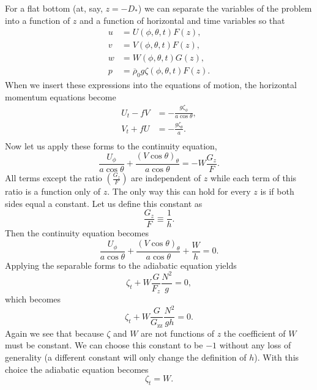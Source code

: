 \documentclass[11pt]{article}
\begin{document}
For a flat bottom (at, say, $z = -D_*$) we can separate the variables of the problem into a function of $z$ and a function of horizontal and time variables so that
\begin{align*}
u &= U(\phi,\theta,t) F(z), \\
v &= V(\phi,\theta,t) F(z), \\
w &= W(\phi,\theta,t) G(z), \\
p &= \overline{\rho}_0 g \zeta(\phi,\theta,t) F(z).
\end{align*}
When we insert these expressions into the equations of motion, the horizontal momentum equations become
\begin{align*}
U_t - f V &= -\frac{g \zeta_\phi}{a \cos\theta}, \\
V_t + f U &= -\frac{g \zeta_\theta}{a}. \\
\end{align*}
Now let us apply these forms to the continuity equation,
\begin{equation*}
\frac{U_\phi}{a\cos\theta}+\frac{\left(V\cos\theta\right)_\theta}{a\cos\theta}=-W\frac{G_z}{F}.
\end{equation*}
All terms except the ratio $\left(\frac{G_z}{F}\right)$ are independent of $z$ while each term of this ratio is a function only of $z$. The only way this can hold for every $z$ is if both sides equal a constant. Let us define this constant as
\begin{equation*}
\frac{G_z}{F} \equiv \frac{1}{h}.
\end{equation*}
Then the continuity equation becomes
\begin{equation*}
\frac{U_\phi}{a\cos\theta}+\frac{\left(V\cos\theta\right)_\theta}{a\cos\theta}+\frac{W}{h} = 0.
\end{equation*}
Applying the separable forms to the adiabatic equation yields
\begin{equation*}
\zeta_t+W\frac{G}{F_z}\frac{N^2}{g} = 0,
\end{equation*}
which becomes
\begin{equation*}
\zeta_t+W\frac{G}{G_\textrm{zz}}\frac{N^2}{g h} = 0.
\end{equation*}
Again we see that because $\zeta$ and $W$ are not functions of $z$ the coefficient of $W$ must be constant. We can choose this constant to be $-1$ without any loss of generality (a different constant will only change the definition of $h$). With this choice the adiabatic equation becomes
\begin{equation*}
\zeta_t = W.
\end{equation*}
\end{document}
